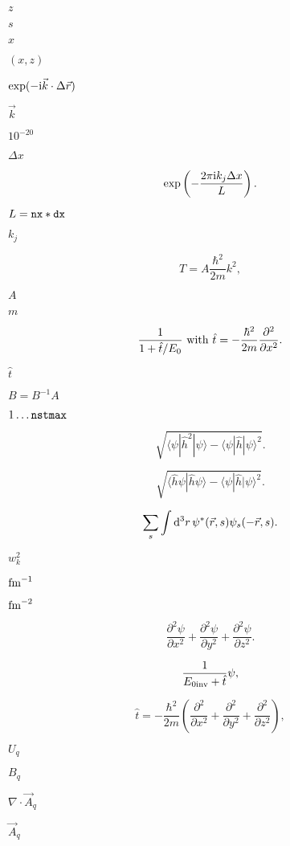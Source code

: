 \documentclass{article}
\begin{document}
$ z $
\pagebreak

$ s $
\pagebreak

$ x $
\pagebreak

$ (x,z) $
\pagebreak

$ \exp(-{\mathrm i}\vec k\cdot\Delta\vec r) $
\pagebreak

$ \vec k $
\pagebreak

$ 10^{-20} $
\pagebreak

$ \Delta x $
\pagebreak

\[ \exp\left(-\frac{2\pi{\mathrm i} k_j \Delta x}{L}\right). \]
\pagebreak

$ L={\tt nx*dx} $
\pagebreak

$ k_j $
\pagebreak

\[ T=A\frac{\hbar^2}{2m}k^2, \]
\pagebreak

$ A $
\pagebreak

$ m $
\pagebreak

\[ \frac{1}{1+\hat t/E_0} {\rm~with~} \hat t=-\frac{\hbar^2}{2m}\frac{\partial^2}{\partial x^2}. \]
\pagebreak

$ \hat t $
\pagebreak

$ B=B^{-1}A $
\pagebreak

$ 1\ldots{\tt nstmax} $
\pagebreak

\[ \sqrt{\langle\psi|\hat h^2|\psi\rangle-\langle\psi|\hat h|\psi\rangle^2}. \]
\pagebreak

\[ \sqrt{\langle\hat h\psi|\hat h\psi\rangle-\langle\psi|\hat h|\psi\rangle^2}. \]
\pagebreak

\[ \sum_s\int{\mathrm d}^3r\, \psi^*(\vec r,s)\psi_s(-\vec r,s). \]
\pagebreak

$ w_k^2 $
\pagebreak

$ {\rm fm}^{-1} $
\pagebreak

$ {\rm fm}^{-2} $
\pagebreak

\[\frac{\partial^2\psi}{\partial x^2}+\frac{\partial^2\psi} {\partial y^2}+\frac{\partial^2\psi} {\partial z^2}. \]
\pagebreak

\[ \frac1{E_{0\rm inv}+\hat t}\psi, \]
\pagebreak

\[ \hat t=-\frac{\hbar^2}{2m}\left(\frac{\partial^2} {\partial x^2}+\frac{\partial^2} {\partial y^2}+\frac{\partial^2}{\partial z^2}\right), \]
\pagebreak

$ U_q $
\pagebreak

$ B_q $
\pagebreak

$ \nabla\cdot\vec A_q $
\pagebreak

$ \vec A_q $
\pagebreak
\end{document}
